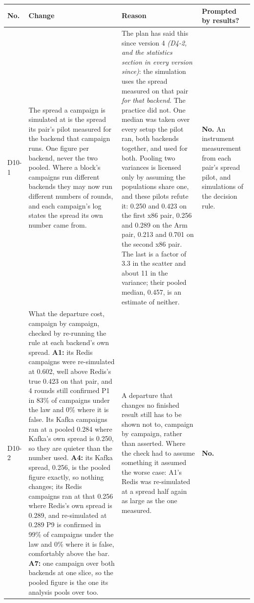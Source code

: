 \documentclass[11pt]{article}
\newcommand{\gl}[1]{{\color{soft}\itshape\small (#1)}}
\begin{document}
{\small
\begin{longtable}{@{}p{1.1cm} >{\raggedright\arraybackslash}p{6.1cm} >{\raggedright\arraybackslash}p{6.0cm} >{\raggedright\arraybackslash}p{2.2cm}@{}}
\toprule
\textbf{No.} & \textbf{Change} & \textbf{Reason} & \textbf{Prompted by results?} \\
\midrule
\endhead
D10-1 & The spread a campaign is simulated at is the spread its pair's pilot measured for the
backend that campaign runs. One figure per backend, never the two pooled. Where a block's
campaigns run different backends they may now run different numbers of rounds, and each
campaign's log states the spread its own number came from. & The plan has said this since version
4 \gl{D4-2, and the statistics section in every version since}: the simulation uses the spread
measured on that pair \emph{for that backend}. The practice did not. One median was taken over
every setup the pilot ran, both backends together, and used for both. Pooling two variances is
licensed only by assuming the populations share one, and these pilots refute it: 0.250 and 0.423
on the first x86 pair, 0.256 and 0.289 on the Arm pair, 0.213 and 0.701 on the second x86 pair.
The last is a factor of 3.3 in the scatter and about 11 in the variance; their pooled median,
0.457, is an estimate of neither. & \textbf{No.} An instrument measurement from each pair's
spread pilot, and simulations of the decision rule. \\
D10-2 & What the departure cost, campaign by campaign, checked by re-running the rule at each
backend's own spread. \textbf{A1:} its Redis campaigns were re-simulated at 0.602, well above
Redis's true 0.423 on that pair, and 4 rounds still confirmed P1 in 83\% of campaigns under the
law and 0\% where it is false. Its Kafka campaigns ran at a pooled 0.284 where Kafka's own spread
is 0.250, so they are quieter than the number used. \textbf{A4:} its Kafka spread, 0.256, is the
pooled figure exactly, so nothing changes; its Redis campaigns ran at that 0.256 where Redis's own
spread is 0.289, and re-simulated at 0.289 P9 is confirmed in 99\% of campaigns under the law and 0\% where it is false, comfortably above the bar. \textbf{A7:} one
campaign over both backends at one slice, so the pooled figure is the one its analysis pools over
too. & A departure that changes no finished result still has to be shown not to, campaign by
campaign, rather than asserted. Where the check had to assume something it assumed the worse case:
A1's Redis was re-simulated at a spread half again as large as the one measured. & \textbf{No.}

\end{longtable}}
\end{document}
